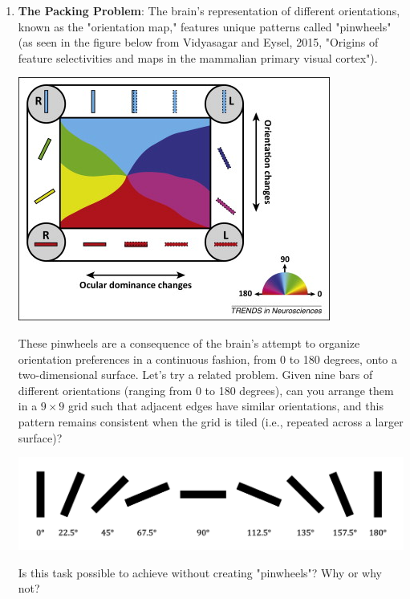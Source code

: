 \documentclass[11pt,letterpaper]{article}
\begin{document}
\begin{enumerate}
    \item \textbf{The Packing Problem}: The brain's representation of different orientations, known as the "orientation map," features unique patterns called "pinwheels" (as seen in the figure below from Vidyasagar and Eysel, 2015, "Origins of feature selectivities and maps in the mammalian primary visual cortex").

    \begin{center}
    \includegraphics[scale=0.8]{pinwheel.jpg}
    \end{center}
    
    These pinwheels are a consequence of the brain's attempt to organize orientation preferences in a continuous fashion, from 0 to 180 degrees, onto a two-dimensional surface. Let's try a related problem. Given nine bars of different orientations (ranging from 0 to 180 degrees), can you arrange them in a $9 \times 9$ grid such that adjacent edges have similar orientations, and this pattern remains consistent when the grid is tiled (i.e., repeated across a larger surface)?
    \begin{center}
    \includegraphics[scale=0.4]{orientations.png}
    \end{center}
    Is this task possible to achieve without creating "pinwheels"? Why or why not?
    

\end{enumerate}
\end{document}
